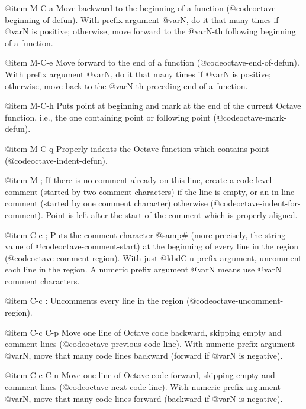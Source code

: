 @item M-C-a
Move backward to the beginning of a function
(@code{octave-beginning-of-defun}).
With prefix argument @var{N}, do it that many times if @var{N} is
positive;  otherwise, move forward to the @var{N}-th following beginning
of a function.

@item M-C-e
Move forward to the end of a function (@code{octave-end-of-defun}).
With prefix argument @var{N}, do it that many times if @var{N} is
positive;  otherwise, move back to the @var{N}-th preceding end of a
function.

@item M-C-h
Puts point at beginning and mark at the end of the current Octave
function, i.e., the one containing point or following point
(@code{octave-mark-defun}).

@item M-C-q
Properly indents the Octave function which contains point
(@code{octave-indent-defun}).

@item M-;
If there is no comment already on this line, create a code-level comment
(started by two comment characters) if the line is empty, or an in-line
comment (started by one comment character) otherwise
(@code{octave-indent-for-comment}).
Point is left after the start of the comment which is properly aligned.

@item C-c ;
Puts the comment character @samp{#} (more precisely, the string value of
@code{octave-comment-start}) at the beginning of every line in the
region (@code{octave-comment-region}).  With just @kbd{C-u} prefix
argument, uncomment each line in the region.  A numeric prefix argument
@var{N} means use @var{N} comment characters.

@item C-c :
Uncomments every line in the region (@code{octave-uncomment-region}).

@item C-c C-p
Move one line of Octave code backward, skipping empty and comment lines
(@code{octave-previous-code-line}).  With numeric prefix argument
@var{N}, move that many code lines backward (forward if @var{N} is
negative).

@item C-c C-n
Move one line of Octave code forward, skipping empty and comment lines
(@code{octave-next-code-line}).  With numeric prefix argument @var{N},
move that many code lines forward (backward if @var{N} is negative).

